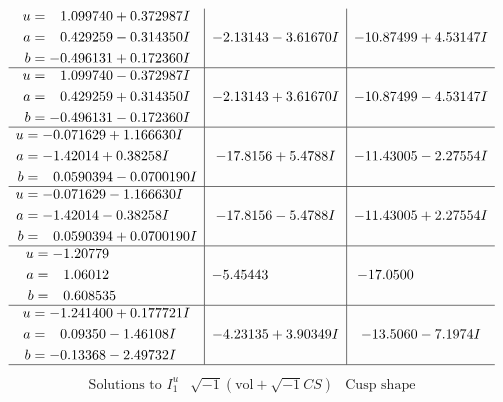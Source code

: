 \documentclass[1p]{elsarticle_modified}
\theoremstyle{definition}
\newcommand{\I}{\sqrt{-1}}
\begin{document}
$$\begin{array}{c|c|c}
\begin{aligned}
u &= \phantom{-}1.099740 + 0.372987 I \\
a &= \phantom{-}0.429259 - 0.314350 I \\
b &= -0.496131 + 0.172360 I\end{aligned}
 & -2.13143 - 3.61670 I & -10.87499 + 4.53147 I \\ \hline\begin{aligned}
u &= \phantom{-}1.099740 - 0.372987 I \\
a &= \phantom{-}0.429259 + 0.314350 I \\
b &= -0.496131 - 0.172360 I\end{aligned}
 & -2.13143 + 3.61670 I & -10.87499 - 4.53147 I \\ \hline\begin{aligned}
u &= -0.071629 + 1.166630 I \\
a &= -1.42014 + 0.38258 I \\
b &= \phantom{-}0.0590394 - 0.0700190 I\end{aligned}
 & -17.8156 + 5.4788 I & -11.43005 - 2.27554 I \\ \hline\begin{aligned}
u &= -0.071629 - 1.166630 I \\
a &= -1.42014 - 0.38258 I \\
b &= \phantom{-}0.0590394 + 0.0700190 I\end{aligned}
 & -17.8156 - 5.4788 I & -11.43005 + 2.27554 I \\ \hline\begin{aligned}
u &= -1.20779\phantom{ +0.000000I} \\
a &= \phantom{-}1.06012\phantom{ +0.000000I} \\
b &= \phantom{-}0.608535\phantom{ +0.000000I}\end{aligned}
 & -5.45443\phantom{ +0.000000I} & -17.0500\phantom{ +0.000000I} \\ \hline\begin{aligned}
u &= -1.241400 + 0.177721 I \\
a &= \phantom{-}0.09350 - 1.46108 I \\
b &= -0.13368 - 2.49732 I\end{aligned}
 & -4.23135 + 3.90349 I & -13.5060 - 7.1974 I\\
 \hline 
 \end{array}$$\newpage$$\begin{array}{c|c|c}  
\text{Solutions to }I^u_{1}& \I (\text{vol} + \sqrt{-1}CS) & \text{Cusp shape}\\
 \hline 
\begin{aligned}

\end{aligned}
\end{array}$$
\end{document}
